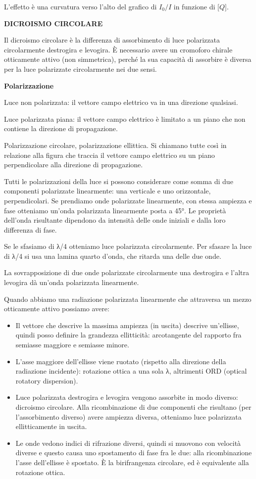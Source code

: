 L'effetto è una curvatura verso l'alto del grafico di \(I_{0}/I\) in
funzione di \(\lbrack Q\rbrack\).

\textbf{DICROISMO CIRCOLARE}

Il dicroismo circolare è la differenza di assorbimento di luce
polarizzata circolarmente destrogira e levogira. È necessario avere un
cromoforo chirale otticamente attivo (non simmetrica), perché la sua
capacità di assorbire è diversa per la luce polarizzate circolarmente
nei due sensi.

\textbf{Polarizzazione}

Luce non polarizzata: il vettore campo elettrico va in una direzione
qualsiasi.

Luce polarizzata piana: il vettore campo elettrico è limitato a un piano
che non contiene la direzione di propagazione.

Polarizzazione circolare, polarizzazione ellittica. Si chiamano tutte
così in relazione alla figura che traccia il vettore campo elettrico su
un piano perpendicolare alla direzione di propagazione.

Tutti le polarizzazioni della luce si possono considerare come somma di
due componenti polarizzate linearmente: una verticale e uno orizzontale,
perpendicolari. Se prendiamo onde polarizzate linearmente, con stessa
ampiezza e fase otteniamo un'onda polarizzata linearmente posta a 45°.
Le proprietà dell'onda risultante dipendono da intensità delle onde
iniziali e dalla loro differenza di fase.

Se le sfasiamo di λ/4 otteniamo luce polarizzata circolarmente. Per
sfasare la luce di λ/4 si usa una lamina quarto d'onda, che ritarda una
delle due onde.

La sovrapposizione di due onde polarizzate circolarmente una destrogira
e l'altra levogira dà un'onda polarizzata linearmente.

Quando abbiamo una radiazione polarizzata linearmente che attraversa un
mezzo otticamente attivo possiamo avere:

\begin{itemize}
\item
  Il vettore che descrive la massima ampiezza (in uscita) descrive
  un'ellisse, quindi posso definire la grandezza ellitticità:
  arcotangente del rapporto fra semiasse maggiore e semiasse minore.
\item
  L'asse maggiore dell'ellisse viene ruotato (rispetto alla direzione
  della radiazione incidente): rotazione ottica a una sola λ, altrimenti
  ORD (optical rotatory dispersion).
\item
  Luce polarizzata destrogira e levogira vengono assorbite in modo
  diverso: dicroismo circolare. Alla ricombinazione di due componenti
  che risultano (per l'assorbimento diverso) avere ampiezza diversa,
  otteniamo luce polarizzata ellitticamente in uscita.
\item
  Le onde vedono indici di rifrazione diversi, quindi si muovono con
  velocità diverse e questo causa uno spostamento di fase fra le due:
  alla ricombinazione l'asse dell'ellisse è spostato. È la birifrangenza
  circolare, ed è equivalente alla rotazione ottica.
\end{itemize}


